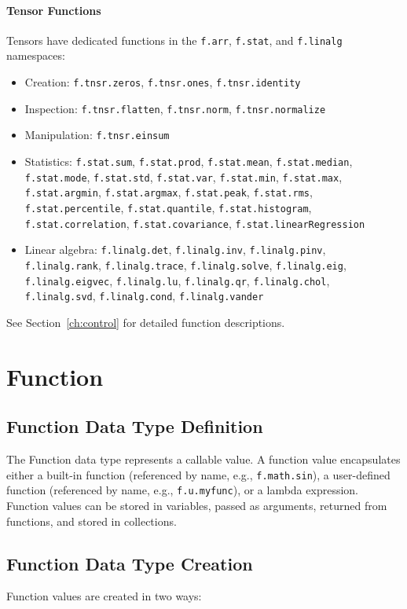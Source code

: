 \paragraph{Tensor Functions}
Tensors have dedicated functions in the \texttt{f.arr}, \texttt{f.stat}, and \texttt{f.linalg} namespaces:
\begin{itemize}
\item Creation: \texttt{f.tnsr.zeros}, \texttt{f.tnsr.ones}, \texttt{f.tnsr.identity}
\item Inspection: \texttt{f.tnsr.flatten}, \texttt{f.tnsr.norm}, \texttt{f.tnsr.normalize}
\item Manipulation: \texttt{f.tnsr.einsum}
\item Statistics: \texttt{f.stat.sum}, \texttt{f.stat.prod}, \texttt{f.stat.mean}, \texttt{f.stat.median}, \texttt{f.stat.mode}, \texttt{f.stat.std}, \texttt{f.stat.var}, \texttt{f.stat.min}, \texttt{f.stat.max}, \texttt{f.stat.argmin}, \texttt{f.stat.argmax}, \texttt{f.stat.peak}, \texttt{f.stat.rms}, \texttt{f.stat.percentile}, \texttt{f.stat.quantile}, \texttt{f.stat.histogram}, \texttt{f.stat.correlation}, \texttt{f.stat.covariance}, \texttt{f.stat.linearRegression}
\item Linear algebra: \texttt{f.linalg.det}, \texttt{f.linalg.inv}, \texttt{f.linalg.pinv}, \texttt{f.linalg.rank}, \texttt{f.linalg.trace}, \texttt{f.linalg.solve}, \texttt{f.linalg.eig}, \texttt{f.linalg.eigvec}, \texttt{f.linalg.lu}, \texttt{f.linalg.qr}, \texttt{f.linalg.chol}, \texttt{f.linalg.svd}, \texttt{f.linalg.cond}, \texttt{f.linalg.vander}
\end{itemize}
See Section~\ref{ch:control} for detailed function descriptions.

\section{Function}
\subsection{Function Data Type Definition}
The Function data type represents a callable value. A function value encapsulates either a built-in function (referenced by name, e.g., \texttt{f.math.sin}), a user-defined function (referenced by name, e.g., \texttt{f.u.myfunc}), or a lambda expression. Function values can be stored in variables, passed as arguments, returned from functions, and stored in collections.

\subsection{Function Data Type Creation}
Function values are created in two ways:

